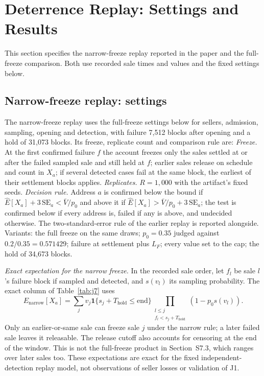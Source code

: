 \documentclass[10pt,a4paper]{article}
\newcommand{\Thold}{T_{\mathrm{hold}}}
\theoremstyle{plain}
\theoremstyle{remark}
\begin{document}
\section{Deterrence Replay: Settings and Results}
\label{sec:s5}

This section specifies the narrow-freeze replay reported in the paper and the full-freeze comparison. Both use recorded sale times and values and the fixed settings below.

\subsection{Narrow-freeze replay: settings}
\label{sec:j7reg}

The narrow-freeze replay uses the full-freeze settings below for sellers, admission, sampling, opening and detection, with failure 7,512 blocks after opening and a hold of 31,073 blocks. Its freeze, replicate count and comparison rule are: \emph{Freeze.} At the first confirmed failure $f$ the account freezes only the sales settled at or after the failed sampled sale and still held at $f$; earlier sales release on schedule and count in $X_a$; if several detected cases fail at the same block, the earliest of their settlement blocks applies. \emph{Replicates.} $R=1{,}000$ with the artifact's fixed seeds. \emph{Decision rule.} Address $a$ is confirmed below the bound if $\hat E[X_a]+3\,\mathrm{SE}_a<\bar V/p_0$ and above it if $\hat E[X_a]>\bar V/p_0+3\,\mathrm{SE}_a$; the test is confirmed below if every address is, failed if any is above, and undecided otherwise. The two-standard-error rule of the earlier replay is reported alongside. Variants: the full freeze on the same draws; $p_0=0.35$ judged against $0.2/0.35=0.571429$; failure at settlement plus $L_F$; every value set to the cap; the hold of 34,673 blocks.

\emph{Exact expectation for the narrow freeze.} In the recorded sale order, let $f_l$ be sale $l$'s failure block if sampled and detected, and $s(v_l)$ its sampling probability. The exact column of Table~\ref{tab:j7} uses
\[
 E_{\mathrm{narrow}}[X_a]=\sum_j v_j\mathbf1\{s_j+\Thold\le\mathrm{end}\}
 \prod_{\substack{l\le j\\ f_l<s_j+\Thold}}(1-p_0s(v_l)).
\]
Only an earlier-or-same sale can freeze sale $j$ under the narrow rule; a later failed sale leaves it releasable. The release cutoff also accounts for censoring at the end of the window. This is not the full-freeze product in Section~S7.3, which ranges over later sales too. These expectations are exact for the fixed independent-detection replay model, not observations of seller losses or validation of J1.
\end{document}
